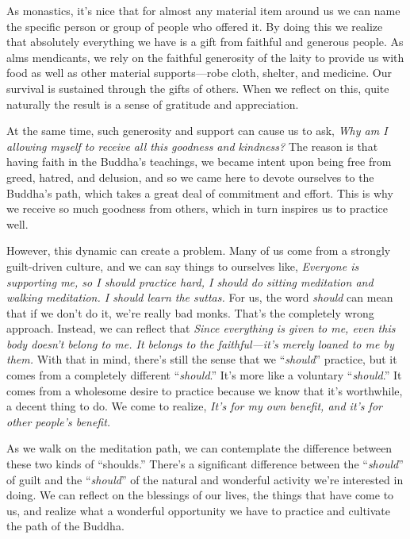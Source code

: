 As monastics, it's nice that for almost any material item around us we 
can name the specific person or group of people who offered it. By 
doing this we realize that absolutely everything we have is a gift from 
faithful and generous people. As alms mendicants, we rely on the 
faithful generosity of the laity to provide us with food as well as 
other material supports---robe cloth, shelter, and medicine. Our 
survival is sustained through the gifts of others. When we reflect on 
this, quite naturally the result is a sense of gratitude and 
appreciation.

At the same time, such generosity and support can cause us to ask,
\emph{Why am I allowing myself to receive all this goodness and
kindness?} The reason is that having faith in the Buddha's
\mbox{teachings,} we became intent upon being free from greed, hatred,
and delusion, and so we came here to devote ourselves to the Buddha's
path, which takes a great deal of commitment and effort. This is why we
receive so much goodness from others, which in turn inspires us to
practice well.

However, this dynamic can create a problem. Many of us come from a 
strongly guilt-driven culture, and we can say things to ourselves like, 
\emph{Everyone is supporting me, so I should practice hard, I should do 
sitting meditation and walking meditation. I should learn the suttas.} 
For us, the word \emph{should} can mean that if we don't do it, we're 
really bad monks. That's the completely wrong approach. Instead, we can 
reflect that \emph{Since everything is given to me, even this body 
doesn't belong to me. It belongs to the faithful---it's merely loaned 
to me by them.} With that in mind, there's still the sense that we 
``\emph{should}'' practice, but it comes from a completely different 
``\emph{should}.'' It's more like a voluntary ``\emph{should}.'' It 
comes from a wholesome desire to practice because we know that it's 
worthwhile, a decent thing to do. We come to realize, \emph{It's for my 
own benefit, and it's for other people's benefit.}

As we walk on the meditation path, we can contemplate the difference 
between these two kinds of ``shoulds.'' There's a significant 
difference between the ``\emph{should}'' of guilt and the 
``\emph{should}'' of the natural and wonderful activity we're 
interested in doing. We can reflect on the blessings of our lives, the 
things that have come to us, and realize what a wonderful opportunity 
we have to practice and cultivate the path of the Buddha.

